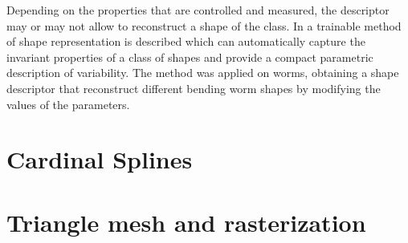 Depending on the properties that are controlled and measured, the descriptor
may or may not allow to reconstruct a shape of the class. In \cite{wormparam} 
a trainable method of shape representation is described which can
automatically capture the invariant properties of a class of shapes and 
provide a compact parametric description of variability. The method was
applied on worms, obtaining a shape descriptor that reconstruct different
bending worm shapes by modifying the values of the parameters.\\


\section{Cardinal Splines}
\label{sec:splines}

\section{Triangle mesh and rasterization}
\label{sec:triangle}


